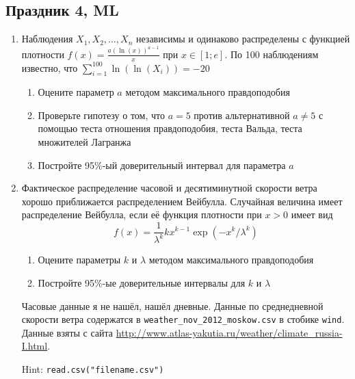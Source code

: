 \documentclass[12pt, a4paper]{article}\usepackage[]{graphicx}\usepackage[]{color}
\begin{document}
\subsection{Праздник 4, ML}

\WhiteRoseLine

\begin{enumerate}
\item Наблюдения $X_1,X_2,\ldots,X_n$ независимы и одинаково распределены с функцией плотности $f(x)=\frac{a(\ln(x))^{a-1}}{x}$ при $x\in [1;e]$. По 100 наблюдениям известно, что $\sum_{i=1}^{100} \ln(\ln(X_i))=-20$
\begin{enumerate}
\item Оцените параметр $a$ методом максимального правдоподобия
\item Проверьте гипотезу о том, что $a=5$ против альтернативной $a\neq 5$ с помощью теста отношения правдоподобия, теста Вальда, теста множителей Лагранжа
\item Постройте 95\%-ый доверительный интервал для параметра $a$
\end{enumerate}
\item \useR Фактическое распределение часовой и десятиминутной скорости ветра хорошо приближается распределением Вейбулла. Случайная величина имеет распределение Вейбулла, если её функция плотности при $x>0$ имеет вид
\[
f(x)=\frac{1}{\lambda^k}kx^{k-1}\exp(-x^k/\lambda^k)
\]
\begin{enumerate}
\item Оцените параметры $k$ и $\lambda$ методом максимального правдоподобия
\item Постройте 95\%-ые доверительные интервалы для $k$ и $\lambda$
\end{enumerate}
Часовые данные я не нашёл, нашёл дневные. Данные по среднедневной скорости ветра содержатся в \verb|weather_nov_2012_moskow.csv| в стобике \verb|wind|. Данные взяты с сайта \url{http://www.atlas-yakutia.ru/weather/climate_russia-I.html}.

Hint: \verb|read.csv("filename.csv")|
\end{enumerate}

\RedRoseLine
\end{document}

